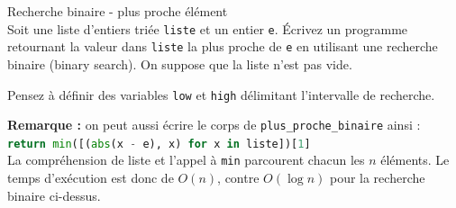 \begin{Exercice}[15 minutes] [Python] Recherche binaire - plus proche élément\\

Soit une liste d'entiers triée \lstinline{liste} et un entier \lstinline{e}. Écrivez un programme retournant la valeur dans \lstinline{liste} la plus proche de \lstinline{e} en utilisant une recherche binaire (binary search). On suppose que la liste n'est pas vide. \\



\begin{conseil}
    Pensez à définir des variables \lstinline{low} et \lstinline{high} délimitant l'intervalle de recherche. 
    
\end{conseil}

    \begin{solution}
        
    \end{solution}
    \begin{solution}
        

        \textbf{Remarque :} on peut aussi écrire le corps de \lstinline{plus_proche_binaire} ainsi :\\
        \lstinline[language=Python]{return min([(abs(x - e), x) for x in liste])[1]}\\
        La compréhension de liste et l'appel à \lstinline{min} parcourent chacun les $n$ éléments. Le temps d'exécution est donc de $O(n)$, contre $O(\log n)$ pour la recherche binaire ci-dessus.
    \end{solution}

\end{Exercice}



